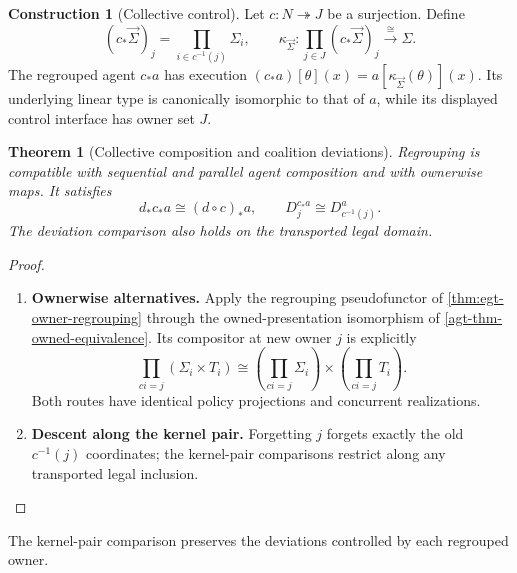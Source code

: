 \documentclass[11pt,a4paper]{article}
\numberwithin{equation}{section}
\newtheorem{theorem}{Theorem}[section]
\theoremstyle{definition}
\newtheorem{construction}[construction]{Construction}
\theoremstyle{remark}
\theoremstyle{plain}
\providecommand{\sig}{\vec{\Sigma}}
\begin{document}
\begin{construction}[Collective control]
Let $c:N\twoheadrightarrow J$ be a surjection. Define
\[
 (c_*\sig)_j=\prod_{i\in c^{-1}(j)}\Sigma_i,
 \qquad
 \kappa_{\sig}:\prod_{j\in J}(c_*\sig)_j\xrightarrow{\cong}\Sigma.
\]
The regrouped agent $c_*a$ has execution
$(c_*a)[\theta](x)=a[\kappa_{\sig}(\theta)](x)$.
Its underlying linear type is canonically isomorphic to that of $a$, while
its displayed control interface has owner set $J$.
\end{construction}

\begin{theorem}[Collective composition and coalition deviations]
\label{agt-thm-regroup}
Regrouping is compatible with sequential and parallel agent composition and
with ownerwise maps. It satisfies
\[
 d_*c_*a\cong(d\circ c)_*a,
 \qquad
 D_j^{c_*a}\cong D_{c^{-1}(j)}^a.
\]
The deviation comparison also holds on the transported legal domain.
\end{theorem}
\begin{proof}
\leavevmode
\begin{enumerate}[label=\textup{(\arabic*)},leftmargin=*,itemsep=4pt,topsep=3pt]
  \item \textbf{Ownerwise alternatives.} Apply the regrouping pseudofunctor of
\cref{thm:egt-owner-regrouping} through the owned-presentation
isomorphism of \cref{agt-thm-owned-equivalence}. Its compositor at new
owner $j$ is explicitly
\[
 \prod_{ci=j}(\Sigma_i\times T_i)
 \cong\left(\prod_{ci=j}\Sigma_i\right)
       \times\left(\prod_{ci=j}T_i\right).
\]
Both routes have identical policy projections and concurrent realizations.
  \item \textbf{Descent along the kernel pair.} Forgetting $j$ forgets exactly the old $c^{-1}(j)$ coordinates; the
kernel-pair comparisons restrict along any transported legal inclusion.
\end{enumerate}
\end{proof}

\noindent The kernel-pair comparison preserves the deviations controlled by each regrouped owner.
\begin{center}
\end{center}
\end{document}

